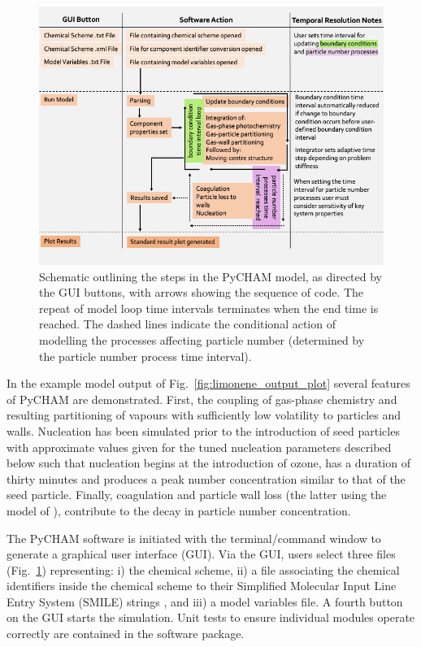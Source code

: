 \documentclass[gmd, manuscript]{copernicus}
\begin{document}
\begin{figure}[t]
\includegraphics[width=12.0cm]{Results/model_flow_diagram.png}
\caption{Schematic outlining the steps in the PyCHAM model, as directed by the GUI buttons, with arrows showing the sequence of code.  The repeat of model loop time intervals terminates when the end time is reached.  The dashed lines indicate the conditional action of modelling the processes affecting particle number (determined by the particle number process time interval).}
\label{fig:schematic}
\end{figure}

In the example model output of Fig.~\ref{fig:limonene_output_plot} several features of PyCHAM are demonstrated.  First, the coupling of gas-phase chemistry and resulting partitioning of vapours with sufficiently low volatility to particles and walls.  Nucleation has been simulated prior to the introduction of seed particles with approximate values given for the tuned nucleation parameters described below such that nucleation begins at the introduction of ozone, has a duration of thirty minutes and produces a peak number concentration similar to that of the seed particle.  Finally, coagulation and particle wall loss (the latter using the model of \citet{McMurry1985}), contribute to the decay in particle number concentration.

The PyCHAM software is initiated with the terminal/command window to generate a graphical user interface (GUI).  Via the GUI, users select three files (Fig.~\ref{fig:schematic}) representing: i) the chemical scheme, ii) a file associating the chemical identifiers inside the chemical scheme to their Simplified Molecular Input Line Entry System (SMILE) strings \citep{Weininger1988}, and iii) a model variables file.  A fourth button on the GUI starts the simulation.  Unit tests to ensure individual modules operate correctly are contained in the software package.
\end{document}
